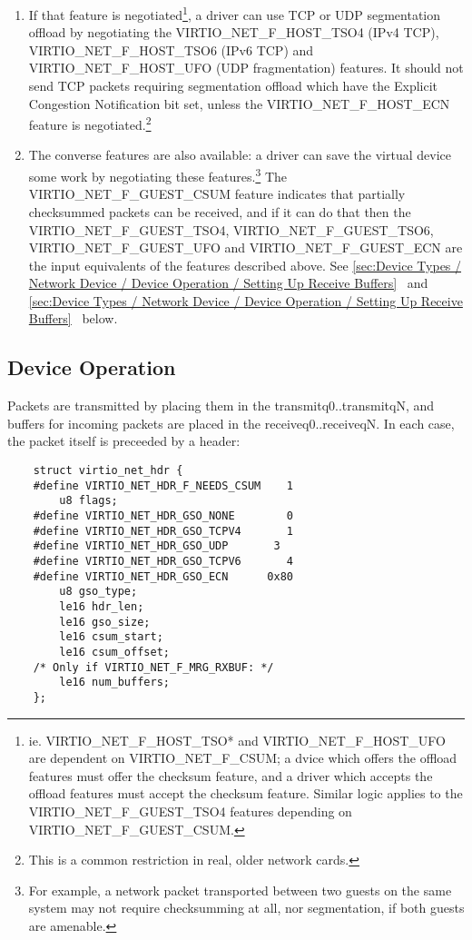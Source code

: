 \begin{enumerate}
\item If that feature is negotiated\footnote{ie. VIRTIO_NET_F_HOST_TSO* and VIRTIO_NET_F_HOST_UFO are
dependent on VIRTIO_NET_F_CSUM; a dvice which offers the offload
features must offer the checksum feature, and a driver which
accepts the offload features must accept the checksum feature.
Similar logic applies to the VIRTIO_NET_F_GUEST_TSO4 features
depending on VIRTIO_NET_F_GUEST_CSUM.
}, a driver can use TCP or UDP
  segmentation offload by negotiating the VIRTIO_NET_F_HOST_TSO4 (IPv4
  TCP), VIRTIO_NET_F_HOST_TSO6 (IPv6 TCP) and VIRTIO_NET_F_HOST_UFO
  (UDP fragmentation) features. It should not send TCP packets
  requiring segmentation offload which have the Explicit Congestion
  Notification bit set, unless the VIRTIO_NET_F_HOST_ECN feature is
  negotiated.\footnote{This is a common restriction in real, older network cards.
}

\item The converse features are also available: a driver can save
  the virtual device some work by negotiating these features.\footnote{For example, a network packet transported between two guests on
the same system may not require checksumming at all, nor segmentation,
if both guests are amenable.
}
   The VIRTIO_NET_F_GUEST_CSUM feature indicates that partially
  checksummed packets can be received, and if it can do that then
  the VIRTIO_NET_F_GUEST_TSO4, VIRTIO_NET_F_GUEST_TSO6,
  VIRTIO_NET_F_GUEST_UFO and VIRTIO_NET_F_GUEST_ECN are the input
  equivalents of the features described above.
  See \ref{sec:Device Types / Network Device / Device Operation / Setting Up Receive Buffers}~ and \ref{sec:Device Types / Network Device / Device Operation / Setting Up Receive Buffers}~ below.
\end{enumerate}

\subsection{Device Operation}\label{sec:Device Types / Network Device / Device Operation}

Packets are transmitted by placing them in the
transmitq0..transmitqN, and buffers for incoming packets are
placed in the receiveq0..receiveqN. In each case, the packet
itself is preceeded by a header:

\begin{lstlisting}
	struct virtio_net_hdr {
	#define VIRTIO_NET_HDR_F_NEEDS_CSUM    1
		u8 flags;
	#define VIRTIO_NET_HDR_GSO_NONE        0
	#define VIRTIO_NET_HDR_GSO_TCPV4       1
	#define VIRTIO_NET_HDR_GSO_UDP		 3
	#define VIRTIO_NET_HDR_GSO_TCPV6       4
	#define VIRTIO_NET_HDR_GSO_ECN      0x80
		u8 gso_type;
		le16 hdr_len;
		le16 gso_size;
		le16 csum_start;
		le16 csum_offset;
	/* Only if VIRTIO_NET_F_MRG_RXBUF: */
		le16 num_buffers;
	};
\end{lstlisting}

